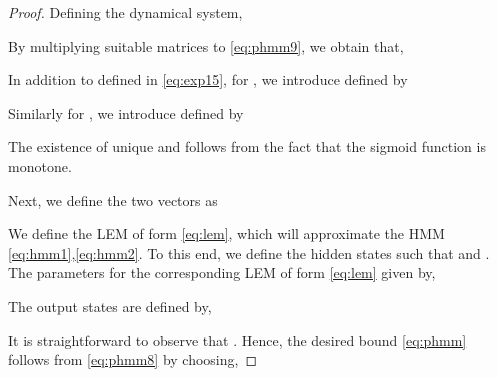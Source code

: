 \documentclass{article} \usepackage{iclr2022_conference,times}
\begin{document}
\begin{proof}
Defining the dynamical system,

By multiplying suitable matrices to \eqref{eq:phmm9}, we obtain that,


In addition to  defined in \eqref{eq:exp15}, for , we introduce  defined by 

Similarly for , we introduce  defined by 

The existence of unique  and  follows from the fact that the sigmoid function  is monotone.

Next, we define the two vectors  as

We define the LEM of form \eqref{eq:lem}, which will approximate the HMM \eqref{eq:hmm1},\eqref{eq:hmm2}. To this end, we define the hidden states  such that  and . The parameters for the corresponding LEM of form \eqref{eq:lem} given by,

The output states are defined by,


It is straightforward to observe that . Hence, the desired bound \eqref{eq:phmm} follows from \eqref{eq:phmm8} by choosing,


\end{proof}
\end{document}
